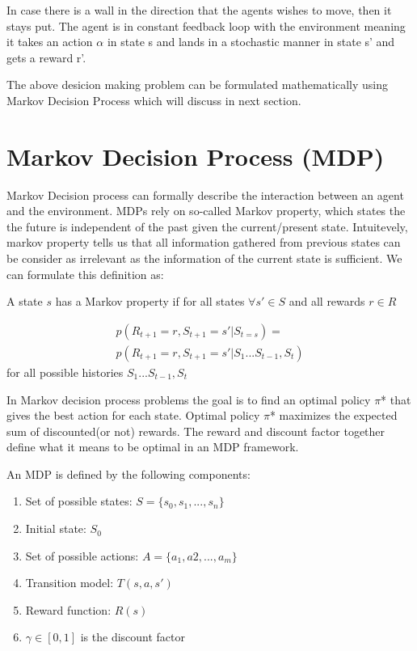 \documentclass[10pt,a4paper,twocolumn]{article}
\begin{document}
	

	In case there is a wall in the direction that the agents wishes to move, then it stays put.
	The agent is in constant feedback loop with the environment meaning it takes an action $\alpha$ in state s and lands in a stochastic manner in state s’ and gets a reward r'.
	
	The above desicion making problem can be formulated mathematically using Markov Decision Process which will discuss in next section.
	
	\section{Markov Decision Process (MDP)}
	
	Markov Decision process can formally describe the interaction between an agent and the environment. MDPs rely on so-called Markov property, which states the the future is independent of the past given the current/present state. Intuitevely, markov property tells us that all information gathered from previous states can be consider as irrelevant as the information of the current state is sufficient. We can formulate this definition as:
	
	A state $s$ has a Markov property if for all states $\forall{s'} \in S$ and all rewards $r \in R$
	
	\begin{equation}
		\begin{split}
			p(R_{t+1} = r , S_{t+1}=s' | S_{t=s}) = \\ 
		 	p(R_{t+1} = r , S_{t+1}=s' | S_{1} ... S_{t-1}, S_{t})
		\end{split}
	\end{equation}
	for all possible histories $ S_{1} ... S_{t-1}, S_{t} $
	
	In Markov decision process problems the goal is to find an optimal policy $\pi$* that gives  the best action for each state. Optimal policy $\pi$* maximizes the expected sum of discounted(or not) rewards. The reward and discount factor together define what it means to be optimal in an MDP framework.
	
	An MDP is defined by the following components:
	\begin{enumerate}
		\item Set of possible states: $S = \{ s_{0}, s_{1}, ..., s_{n} \}$
		\item Initial state: $S_{0}$
		\item Set of possible actions: $A = \{ a_{1}, a{2}, ..., a_{m} \}$
		\item Transition model: $T(s, a, s')$
		\item Reward function: $R(s)$
		\item $\gamma \in [0,1] $ is the discount factor
	\end{enumerate}
\end{document}
